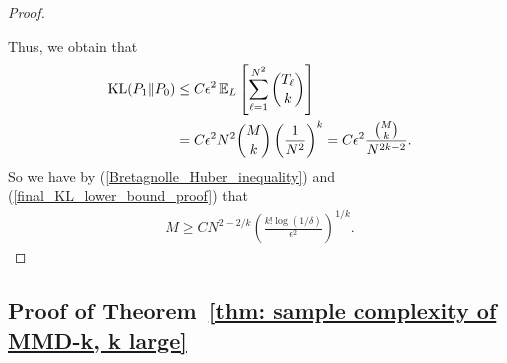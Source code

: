 \documentclass[aps,prx,reprint,superscriptaddress,amsmath,amssymb,longbibliography,floatfix]{revtex4-2}
\newcommand{\dsE}{\mathbb{E}}
\theoremstyle{plain}
\theoremstyle{definition}
\theoremstyle{remark}
\begin{document}
\begin{proof}
\begin{widetext}
\end{widetext}
Thus, we obtain that
\begin{align}\label{final_KL_lower_bound_proof}
    \text{KL} (P_1 \|P_0)
    &\leq
    C \epsilon^2\,
    \dsE_L\left[
    \sum_{\ell=1}^{N^2} \binom{T_\ell}{k}
    \right] \notag\\
    &=
    C \epsilon^2
    N^2\binom{M}{k}\left(\frac1{N^2}\right)^k
    =
    C \epsilon^2 \frac{\binom{M}{k}}{N^{2k-2}}.
\end{align}
So we have by (\ref{Bretagnolle_Huber_inequality}) and (\ref{final_KL_lower_bound_proof}) that 
\begin{align}
    M \geq C N^{2-2/k} \left( \frac{k! \log(1/\delta)}{\epsilon^2} \right)^{1/k}.
\label{eq:app-local-mmd-sample-lower}
\end{align}
\end{proof}









\subsection{Proof of Theorem~\ref{thm: sample complexity of MMD-k, k large}}\label{appsub: MMD-k k large}
\end{document}
